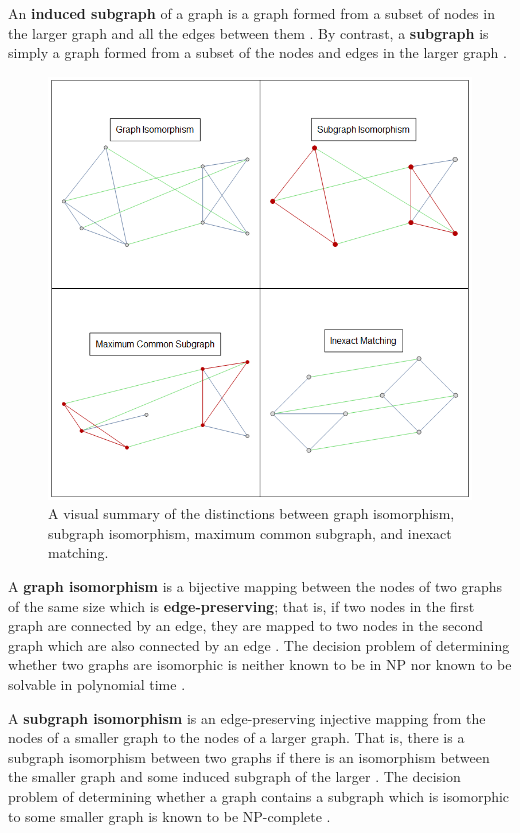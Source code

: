 \documentclass[12pt]{thesis}
\theoremstyle{plain}
\theoremstyle{definition}
\theoremstyle{remark}
\begin{document}
An \textbf{induced subgraph} of a graph is a graph formed from a subset of nodes in the larger graph and all the edges between them \cite{wikiInducedSubgraph}. By contrast, a \textbf{subgraph} is simply a graph formed from a subset of the nodes and edges in the larger graph \cite{wikiSubgraph}.

\begin{figure}[!t]
\centering
\includegraphics[width=\textwidth]{isomorphism_demos.png}
\caption{A visual summary of the distinctions between graph isomorphism, subgraph isomorphism, maximum common subgraph, and inexact matching.}
\label{fig:isomorphism_demos}
\end{figure}

A \textbf{graph isomorphism} is a bijective mapping between the nodes of two graphs of the same size which is \textbf{edge-preserving}; that is, if two nodes in the first graph are connected by an edge, they are mapped to two nodes in the second graph which are also connected by an edge \cite{Conte_2004}. The decision problem of determining whether two graphs are isomorphic is neither known to be in NP nor known to be solvable in polynomial time \cite{wikiGraphIsomorphism}.

A \textbf{subgraph isomorphism} is an edge-preserving injective mapping from the nodes of a smaller graph to the nodes of a larger graph. That is, there is a subgraph isomorphism between two graphs if there is an isomorphism between the smaller graph and some induced subgraph of the larger \cite{Conte_2004}. The decision problem of determining whether a graph contains a subgraph which is isomorphic to some smaller graph is known to be NP-complete \cite{wikiSubgraphIsomorphism}.
\end{document}
